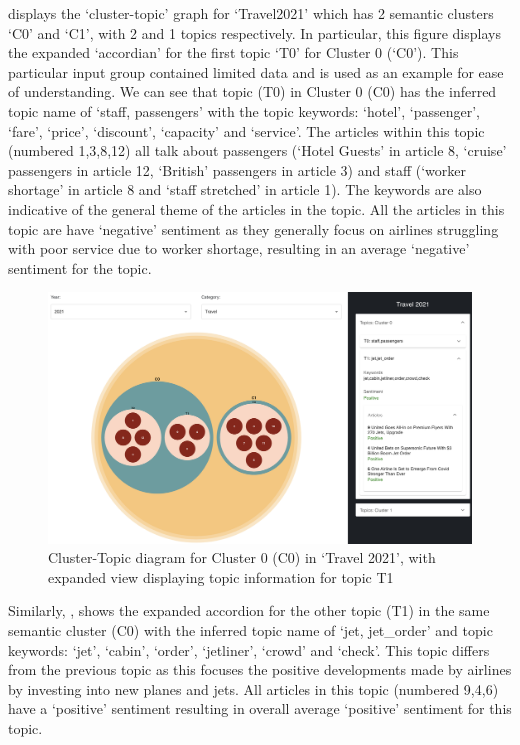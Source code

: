  displays the `cluster-topic' graph for `Travel2021' which has 2 semantic clusters `C0' and `C1', with 2 and 1 topics respectively. In particular, this figure displays the expanded `accordian' for the first topic `T0' for Cluster 0 (`C0'). This particular input group contained limited data and is used as an example for ease of understanding. We can see that topic (T0) in Cluster 0 (C0) has the inferred topic name of `staff, passengers' with the topic keywords: `hotel', `passenger', `fare', `price', `discount', `capacity' and `service'. The articles within this topic (numbered 1,3,8,12) all talk about passengers (`Hotel Guests' in article 8, `cruise' passengers in article 12, `British' passengers in article 3) and staff (`worker shortage' in article 8 and `staff stretched' in article 1). The keywords are also indicative of the general theme of the articles in the topic. All the articles in this topic are have `negative' sentiment as they generally focus on airlines struggling with poor service due to worker shortage, resulting in an average `negative' sentiment for the topic.

\begin{figure}[H]
  \centering
  \includegraphics[width=0.99\linewidth]{images/travel2021_topics_1b.png}
  \caption{Cluster-Topic diagram for Cluster 0 (C0) in `Travel 2021', with expanded view displaying topic information for topic T1}
  \label{fig:topics1b_travel2021}
\end{figure}

Similarly, , shows the expanded accordion for the other topic (T1) in the same semantic cluster (C0) with the inferred topic name of `jet, jet\_order' and topic keywords: `jet', `cabin', `order', `jetliner', `crowd' and `check'. This topic differs from the previous topic as this focuses the positive developments made by airlines by investing into new planes and jets. All articles in this topic (numbered 9,4,6) have a `positive' sentiment resulting in overall average `positive' sentiment for this topic.


